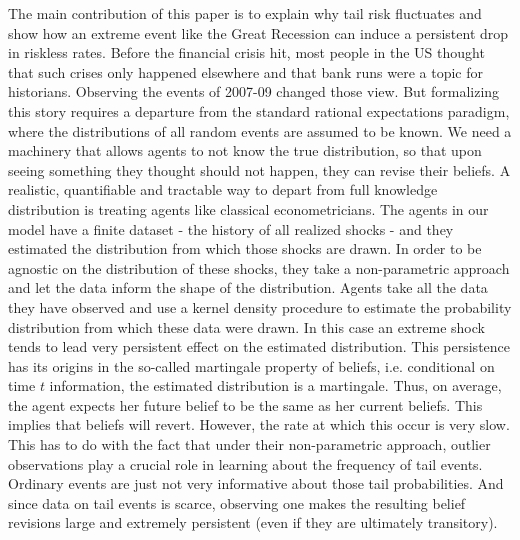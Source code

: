 \documentclass{article}
\begin{document}
{The main contribution of this paper is to explain why tail risk fluctuates and show how an extreme event like the Great Recession can induce a persistent drop in riskless rates. Before the financial crisis hit, most people in the US thought that such crises only happened elsewhere and that bank runs were a topic for historians. Observing the events of 2007-09 changed those view. But formalizing this story requires a departure from the standard rational expectations paradigm, where the distributions of all random events are assumed to be known. We need a machinery that allows agents to not know the true distribution, so that upon seeing something they thought should not happen, they can revise their beliefs. A realistic, quantifiable and tractable way to depart from full knowledge distribution is treating agents like classical econometricians. The agents in our model have a finite dataset - the history of all realized shocks - and they estimated the distribution from which those shocks are drawn. In order to be agnostic on the distribution of these shocks, they take a non-parametric approach and let the data inform the shape of the distribution. Agents take all the data they have observed and use a kernel density procedure to estimate the probability distribution from which these data were drawn. In this case an extreme shock tends to lead very persistent effect on the estimated distribution. This persistence has its origins in the so-called martingale property of beliefs, i.e. conditional on time $t$ information, the estimated distribution is a martingale. Thus, on average, the agent expects her future belief to be the same as her current beliefs. This implies that beliefs will revert. However, the rate at which this occur is very slow. This has to do with the fact that under their non-parametric approach, outlier observations play a crucial role in learning about the frequency of tail events. Ordinary events are just not very informative about those tail probabilities. And since data on tail events is scarce, observing one makes the resulting belief revisions large and extremely persistent (even if they are ultimately transitory).

}
\end{document}
